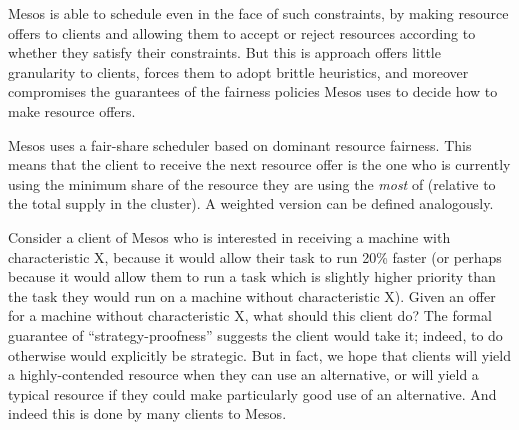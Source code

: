 \documentclass{acm_proc_article-sp}
\begin{document}
Mesos is able to schedule even in the face of such constraints, by making
resource offers to clients and allowing them to accept or reject resources
according to whether they satisfy their constraints. But this is approach offers
little granularity to clients, forces them to adopt brittle heuristics, and
moreover compromises the guarantees of the fairness policies Mesos uses to
decide how to make resource offers.

Mesos uses a fair-share scheduler based on dominant resource fairness. This
means that the client to receive the next resource offer is the one who is
currently using the minimum share of the resource they are using the \emph{most}
of (relative to the total supply in the cluster). A weighted version can be
defined analogously. 

Consider a client of Mesos who is interested in receiving a machine with
characteristic X, because it would allow their task to run 20\% faster (or
perhaps because it would allow them to run a task which is slightly higher
priority than the task they would run on a machine without characteristic X).
Given an offer for a machine without characteristic X, what should this client
do? The formal guarantee of ``strategy-proofness'' suggests the client would take
it; indeed, to do otherwise would explicitly be strategic. But in fact, we hope
that clients will yield a highly-contended resource when they can use an
alternative, or will yield a typical resource if they could make particularly
good use of an alternative. And indeed this is done by many clients to Mesos.
\end{document}
